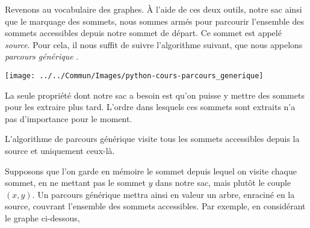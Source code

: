 \documentclass{magnolia}
\begin{document}
Revenons au vocabulaire des graphes. À l'aide de ces deux outils, notre sac ainsi que le
marquage des sommets, nous sommes armés pour parcourir l'ensemble des sommets accessibles
depuis notre sommet de départ. Ce sommet est appelé \emph{source}. Pour cela, il
nous suffit de suivre
l'algorithme suivant, que nous appelons \og \emph{parcours générique} \fg.
\begin{center}
  \texttt{[image: ../../Commun/Images/python-cours-parcours\_generique]}
\end{center}
\vspace{2ex}
\noindent
La seule propriété dont notre sac a besoin est qu'on puisse y mettre des
sommets pour les extraire plus tard. L'ordre dans lesquels ces sommets sont extraits
n'a pas d'importance pour le moment.

\begin{proposition}
L'algorithme de parcours générique visite tous les sommets accessibles depuis la source
et uniquement ceux-là.
\end{proposition}

Supposons que l'on garde en mémoire le sommet depuis lequel on visite chaque sommet,
en ne mettant pas le sommet $y$ dans notre sac, mais plutôt le couple $(x, y)$.
Un parcours
générique mettra ainsi en valeur un arbre, enraciné en la source, couvrant l'ensemble des
sommets accessibles. Par exemple, en considérant
le graphe ci-dessous,
\end{document}
